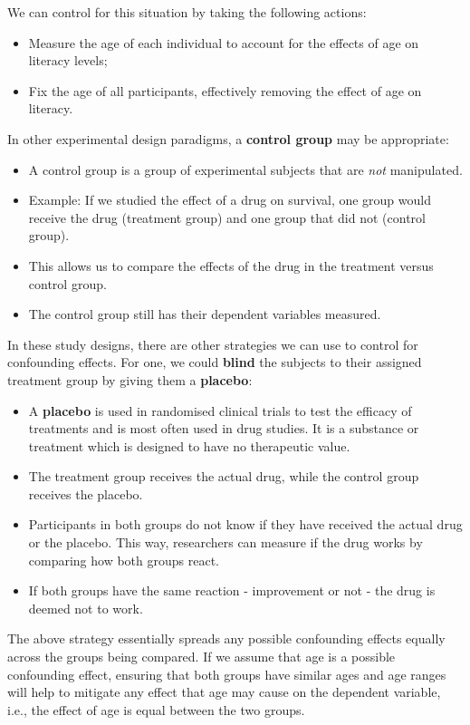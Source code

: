 \documentclass[10pt,a4paper,twoside]{article}\usepackage[]{graphicx}\usepackage[]{xcolor}
\begin{document}
We can control for this situation by taking the following actions:

\begin{itemize}
  \item Measure the age of each individual to account for the effects of age on literacy levels;
  \item Fix the age of all participants, effectively removing the effect of age on literacy.
\end{itemize}

In other experimental design paradigms, a \textbf{control group} may be appropriate:

\begin{itemize}
  \item A control group is a group of experimental subjects that are \emph{not} manipulated.
  \item Example: If we studied the effect of a drug on survival, one group would receive the drug (treatment group) and one group that did not (control group).
  \item This allows us to compare the effects of the drug in the treatment versus control group.
  \item The control group still has their dependent variables measured.
\end{itemize}

In these study designs, there are other strategies we can use to control for confounding effects. For one, we could \textbf{blind} the subjects to their assigned treatment group by giving them a \textbf{placebo}:

\begin{itemize}
  \item A \textbf{placebo} is used in randomised clinical trials to test the efficacy of treatments and is most often used in drug studies. It is a substance or treatment which is designed to have no therapeutic value.
  \item The treatment group receives the actual drug, while the control group receives the placebo.
  \item Participants in both groups do not know if they have received the actual drug or the placebo. This way, researchers can measure if the drug works by comparing how both groups react.
  \item If both groups have the same reaction - improvement or not - the drug is deemed not to work.
\end{itemize}

The above strategy essentially spreads any possible confounding effects equally across the groups being compared. If we assume that age is a possible confounding effect, ensuring that both groups have similar ages and age ranges will help to mitigate any effect that age may cause on the dependent variable, i.e., the effect of age is equal between the two groups.
\end{document}
